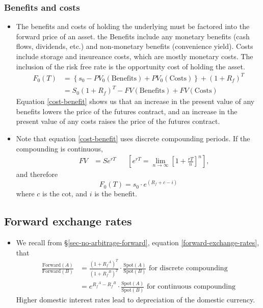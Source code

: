\documentclass[../notes_compiled.tex]{subfiles}
\begin{document}
\subsubsection*{Benefits and costs}
\begin{itemize}
\item The benefits and costs of holding the underlying must be factored into the forward price of an asset. the Benefits include any monetary benefits (cash flows, dividends, etc.) and non-monetary benefits (convenience yield). Costs include storage and insureance costs, which are mostly monetary costs. The inclusion of the risk free rate is the opportunity cost of holding the asset.
\begin{align}
F_{0}(T) &= \left\{ s_{0} - PV_{0}(\text{Benefits}) + PV_{0}(\text{Costs}) \right\} + (1+R_{f})^{T} \label{cost-benefit} \\
&= S_{0}(1+R_{f})^{T} - FV(\text{Benefits}) + FV(\text{Costs}) \nonumber
\end{align}
Equation \ref{cost-benefit} shows us that an increase in the present value of any benefits lowers the price of the futures contract, and an increase in the present value of any costs raises the price of the futures contract.

\item Note that equation \ref{cost-benefit} uses discrete compounding periods. If the compounding is continuous, 
\begin{align}
& & FV &= Se^{rT} & &\left[e^{rT} = \lim_{n\rightarrow\infty}\left[1+\frac{rT}{n}\right]^{n}\right],
\end{align}
and therefore
\begin{equation}
F_{0}(T) = s_{0}\cdot e^{(R_{f} + c - i)}
\end{equation}
where $c$ is the cot, and $i$ is the benefit.
\end{itemize}

\subsection{Forward exchange rates}
\begin{itemize}
\item We recall from \S\ref{sec-no-arbitrage-forward}, equation \ref{forward-exchange-rates}, that 
\begin{align}
\frac{\text{Forward}(A)}{\text{Forward}(B)} &= \frac{(1+{R_{f}}^{A})^{T}}{(1+{R_{f}}^{B})^{T}} \cdot \frac{\text{Spot}(A)}{\text{Spot}(B)} \text{ for discrete compounding} \\
&= e^{{R_{f}}^{A} - {R_{f}}^{B}} \cdot \frac{\text{Spot}(A)}{\text{Spot}(B)} \text{ for continuous compounding}
\end{align}
Higher domestic interest rates lead to depreciation of the domestic currency.
\end{itemize}
\end{document}
